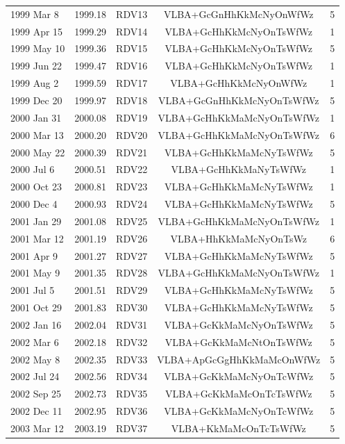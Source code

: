 \begin{table}
\begin{SingleSpace}
\begin{tabular}{lcccc}
1999 Mar 8  & 1999.18 & RDV13  & VLBA+GcGnHhKkMcNyOnWfWz   & 5   \\
1999 Apr 15 & 1999.29 & RDV14  & VLBA+GcHhKkMcNyOnTsWfWz   & 1   \\
1999 May 10 & 1999.36 & RDV15  & VLBA+GcHhKkMcNyOnTsWfWz   & 5   \\
1999 Jun 22 & 1999.47 & RDV16  & VLBA+GcHhKkMcNyOnTsWfWz   & 1   \\
1999 Aug 2  & 1999.59 & RDV17  & VLBA+GcHhKkMcNyOnWfWz     & 1   \\
1999 Dec 20 & 1999.97 & RDV18  & VLBA+GcGnHhKkMcNyOnTsWfWz & 5   \\
2000 Jan 31 & 2000.08 & RDV19  & VLBA+GcHhKkMaMcNyOnTsWfWz & 1   \\
2000 Mar 13 & 2000.20 & RDV20  & VLBA+GcHhKkMaMcNyOnTsWfWz & 6   \\
2000 May 22 & 2000.39 & RDV21  & VLBA+GcHhKkMaMcNyTsWfWz   & 5   \\
2000 Jul 6  & 2000.51 & RDV22  & VLBA+GcHhKkMaNyTsWfWz     & 1   \\
2000 Oct 23 & 2000.81 & RDV23  & VLBA+GcHhKkMaMcNyTsWfWz   & 1   \\
2000 Dec 4  & 2000.93 & RDV24  & VLBA+GcHhKkMaMcNyTsWfWz   & 5   \\
2001 Jan 29 & 2001.08 & RDV25  & VLBA+GcHhKkMaMcNyOnTsWfWz & 1   \\
2001 Mar 12 & 2001.19 & RDV26  & VLBA+HhKkMaMcNyOnTsWz     & 6   \\
2001 Apr 9  & 2001.27 & RDV27  & VLBA+GcHhKkMaMcNyTsWfWz   & 5   \\
2001 May 9  & 2001.35 & RDV28  & VLBA+GcHhKkMaMcNyOnTsWfWz & 1   \\
2001 Jul 5  & 2001.51 & RDV29  & VLBA+GcHhKkMaMcNyTsWfWz   & 5   \\
2001 Oct 29 & 2001.83 & RDV30  & VLBA+GcHhKkMaMcNyTsWfWz   & 5   \\
2002 Jan 16 & 2002.04 & RDV31  & VLBA+GcKkMaMcNyOnTsWfWz   & 5   \\
2002 Mar 6  & 2002.18 & RDV32  & VLBA+GcKkMaMcNtOnTsWfWz   & 5   \\
2002 May 8  & 2002.35 & RDV33  & VLBA+ApGcGgHhKkMaMcOnWfWz & 5   \\
2002 Jul 24 & 2002.56 & RDV34  & VLBA+GcKkMaMcNyOnTcWfWz   & 5   \\
2002 Sep 25 & 2002.73 & RDV35  & VLBA+GcKkMaMcOnTcTsWfWz   & 5   \\
2002 Dec 11 & 2002.95 & RDV36  & VLBA+GcKkMaMcNyOnTcWfWz   & 5   \\
2003 Mar 12 & 2003.19 & RDV37  & VLBA+KkMaMcOnTcTsWfWz     & 5   \\

\end{tabular}
\end{SingleSpace}
\end{table}
